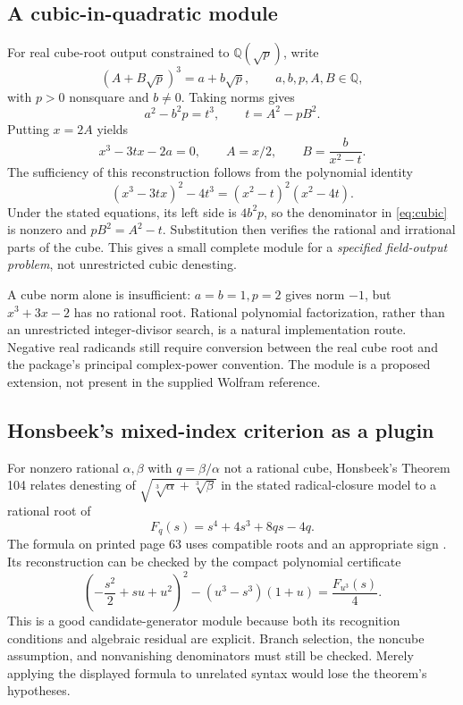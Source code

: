 \documentclass[11pt,letterpaper]{article}
\numberwithin{equation}{section}
\theoremstyle{definition}\newtheorem{definition}[theorem]{Definition}
\theoremstyle{remark}\newtheorem{remark}[theorem]{Remark}
\newcommand{\Q}{\mathbb Q}\newcommand{\C}{\mathbb C}\newcommand{\R}{\mathbb R}\newcommand{\Z}{\mathbb Z}
\begin{document}
\subsection{A cubic-in-quadratic module}
For real cube-root output constrained to $\Q(\sqrt p)$, write
\[
 (A+B\sqrt p)^3=a+b\sqrt p,\qquad a,b,p,A,B\in\Q,
\]
with $p>0$ nonsquare and $b\ne0$. Taking norms gives
\[
 a^2-b^2p=t^3,\qquad t=A^2-pB^2.
\]
Putting $x=2A$ yields
\begin{equation}\label{eq:cubic}
 x^3-3tx-2a=0,\qquad A=x/2,\qquad B=\frac{b}{x^2-t}.
\end{equation}
The sufficiency of this reconstruction follows from the polynomial identity
\begin{equation}\label{eq:cubic-cert}
 (x^3-3tx)^2-4t^3=(x^2-t)^2(x^2-4t).
\end{equation}
Under the stated equations, its left side is $4b^2p$, so the denominator in \eqref{eq:cubic} is nonzero and $pB^2=A^2-t$. Substitution then verifies the rational and irrational parts of the cube. This gives a small complete module for a \emph{specified field-output problem}, not unrestricted cubic denesting.

A cube norm alone is insufficient: $a=b=1,p=2$ gives norm $-1$, but $x^3+3x-2$ has no rational root. Rational polynomial factorization, rather than an unrestricted integer-divisor search, is a natural implementation route. Negative real radicands still require conversion between the real cube root and the package's principal complex-power convention. The module is a proposed extension, not present in the supplied Wolfram reference.

\subsection{Honsbeek's mixed-index criterion as a plugin}
For nonzero rational $\alpha,\beta$ with $q=\beta/\alpha$ not a rational cube, Honsbeek's Theorem 104 relates denesting of $\sqrt{\sqrt[3]\alpha+\sqrt[3]\beta}$ in the stated radical-closure model to a rational root of
\[
 F_q(s)=s^4+4s^3+8qs-4q.
\]
The formula on printed page 63 uses compatible roots and an appropriate sign \cite{honsbeek}. Its reconstruction can be checked by the compact polynomial certificate
\begin{equation}\label{eq:honsbeek}
 \left(-\frac{s^2}{2}+su+u^2\right)^2
 -(u^3-s^3)(1+u)=\frac{F_{u^3}(s)}4.
\end{equation}
This is a good candidate-generator module because both its recognition conditions and algebraic residual are explicit. Branch selection, the noncube assumption, and nonvanishing denominators must still be checked. Merely applying the displayed formula to unrelated syntax would lose the theorem's hypotheses.
\end{document}
